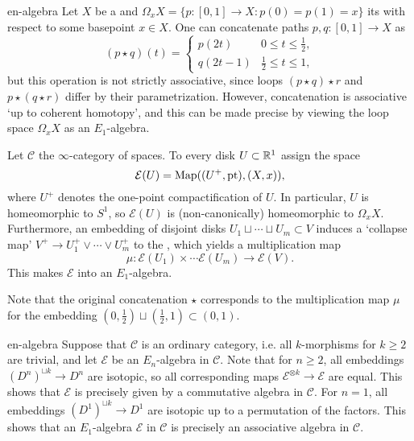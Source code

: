 \begin{example}{en-algebra}
    Let $X$ be a  and $\Omega_x X = \{ p \colon [0, 1] \to X \colon p(0) = p(1) = x \}$ its  with respect to some basepoint $x \in X$. One can concatenate paths $p, q \colon [0, 1] \to X$ as
    \[ (p \star q)(t) = \left\{ \begin{array}{cl}
         p(2t) & 0 \le t \le \tfrac{1}{2} , \\
         q(2t - 1) & \tfrac{1}{2} \le t \le 1 ,
    \end{array} \right. \]
    but this operation is not strictly associative, since loops $(p \star q) \star r$ and $p \star (q \star r)$ differ by their parametrization. However, concatenation is associative `up to coherent homotopy', and this can be made precise by viewing the loop space $\Omega_x X$ as an $E_1$-algebra.
    
    Let $\mathcal{C}$ the $\infty$-category of spaces. To every disk $U \subset \mathbb{R}^1$ assign the space
    \[ \mathcal{E}(U) = \textup{Map}((U^+, \textup{pt}), (X, x)) , \]
    where $U^+$ denotes the one-point compactification of $U$. In particular, $U$ is homeomorphic to $S^1$, so $\mathcal{E}(U)$ is (non-canonically) homeomorphic to $\Omega_x X$. Furthermore, an embedding of disjoint disks $U_1 \sqcup \cdots \sqcup U_m \subset V$ induces a `collapse map' $V^+ \to U_1^+ \vee \cdots \vee U_m^+$ to the , which yields a multiplication map
    \[ \mu \colon \mathcal{E}(U_1) \times \cdots \mathcal{E}(U_m) \to \mathcal{E}(V) . \]
    This makes $\mathcal{E}$ into an $E_1$-algebra.
    
    Note that the original concatenation $\star$ corresponds to the multiplication map $\mu$ for the embedding $(0, \tfrac{1}{2}) \sqcup (\tfrac{1}{2}, 1) \subset (0, 1)$.
\end{example}

\begin{example}{en-algebra}
    Suppose that $\mathcal{C}$ is an ordinary category, i.e. all $k$-morphisms for $k \ge 2$ are trivial, and let $\mathcal{E}$ be an $E_n$-algebra in $\mathcal{C}$. Note that for $n \ge 2$, all embeddings $(D^n)^{\sqcup k} \to D^n$ are isotopic, so all corresponding maps $\mathcal{E}^{\otimes k} \to \mathcal{E}$ are equal. This shows that $\mathcal{E}$ is precisely given by a commutative algebra in $\mathcal{C}$. For $n = 1$, all embeddings $(D^1)^{\sqcup k} \to D^1$ are isotopic up to a permutation of the factors. This shows that an $E_1$-algebra $\mathcal{E}$ in $\mathcal{C}$ is precisely an associative algebra in $\mathcal{C}$.
\end{example}

